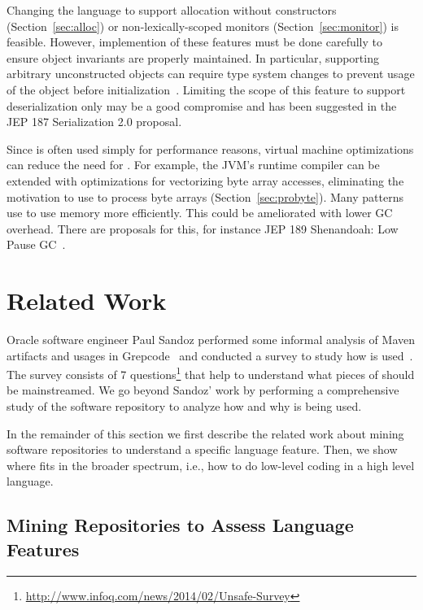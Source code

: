 Changing the language to support allocation without constructors
(Section~\ref{sec:alloc}) or non-lexically-scoped monitors
(Section~\ref{sec:monitor}) is feasible. However, implemention of these
features must be done carefully to ensure object invariants
are properly maintained. In particular, supporting arbitrary unconstructed
objects can require type system changes to prevent usage of the object 
before initialization~\cite{Qi:2009:MTS:1480881.1480890}. Limiting the scope
of this feature to support deserialization only may be a good compromise and
has been suggested in the JEP 187 Serialization 2.0 proposal.

Since \unsafe{} is often used simply for performance reasons, virtual machine
optimizations can reduce the need for \unsafe{}.
For example, 
the JVM's runtime compiler can be extended with optimizations for vectorizing
byte array accesses, eliminating the motivation to use \unsafe{} to process byte
arrays (Section~\ref{sec:probyte}).
Many patterns use \unsafe{} to use memory more efficiently.
This could be ameliorated with lower GC overhead. There are proposals for
this, for instance JEP 189 Shenandoah: Low Pause GC~\cite{jep189}.







\section{Related Work}
\label{sec:unsafe:relatedwork}

Oracle software engineer Paul Sandoz 
performed some informal analysis of Maven artifacts and usages in Grepcode~\cite{sandoz-personal-communication}
and conducted a survey to study how \unsafe{} is used~\cite{psandoz14}.
The survey consists of 7 questions\footnote{\url{http://www.infoq.com/news/2014/02/Unsafe-Survey}} 
that help to understand what pieces of \smu{} should be mainstreamed.
We go beyond Sandoz' work
by performing a comprehensive study of the \mavencentral{} software repository to analyze how and why \smu{} is being used.

In the remainder of this section we first describe the related work about mining software repositories to understand a specific language feature.
Then, we show where \unsafe{} fits in the broader spectrum, i.e., how to do low-level coding in a high level language.


\subsection{Mining Repositories to Assess Language Features}

